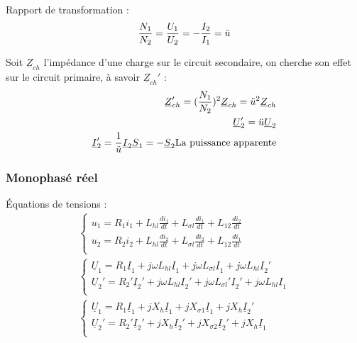 \documentclass[../main.tex]{subfiles}
\begin{document}
Rapport de transformation : \\
\begin{equation}
    \frac{N_1}{N_2} = \frac{U_1}{U_2} = -\frac{I_2}{I_1} = \Ddot{u}
\end{equation}

Soit $\underline{Z}_{ch}$ l'impédance d'une charge sur le circuit secondaire, on cherche son effet sur le circuit primaire, à savoir $\underline{Z}_{ch}'$ : \begin{equation}\begin{split}
    \underline{Z}_{ch}' = (\frac{N_1}{N_2})^2 \underline{Z}_{ch} = \Ddot{u}^2 \underline{Z}_{ch}\\
    \underline{U}_2' = \Ddot{u}\underline{U}_2\\
    \underline{I}_2' = \frac{1}{\Ddot{u}}\underline{I}_2
    \underline{S}_1 = -\underline{S}_2 \text{La puissance apparente}
    \end{split}
\end{equation}

\subsubsection{Monophasé réel}
Équations de tensions : \begin{equation}
    \begin{split}
        \begin{cases}
            u_1 = R_1 i_1 + L_{hl} \frac{di_1}{dt} + L_{\sigma l} \frac{di_1}{dt} + L_{12} \frac{di_2}{dt}\\
            u_2 = R_2 i_2 + L_{hl} \frac{di_2}{dt} + L_{\sigma l} \frac{di_2}{dt} + L_{12} \frac{di_1}{dt}\\
        \end{cases}\\
        \begin{cases}
            \underline{U}_1 = R_1 \underline{I}_1 + j \omega L_{hl} \underline{I}_1 + j \omega L_{\sigma l} \underline{I}_1 + j\omega L_{hl} \underline{I}_2'\\
            \underline{U}_2' = R_2' \underline{I}_2' + j \omega L_{hl} \underline{I}_2' + j \omega L_{\sigma l}' \underline{I}_2' + j\omega L_{hl} \underline{I}_1\\
        \end{cases}\\
        \begin{cases}
            \underline{U}_1 = R_1 \underline{I}_1 + j X_h \underline{I}_1 + j X_{\sigma 1} \underline{I}_1 + j X_{h} \underline{I}_2'\\
            \underline{U}_2' = R_2' \underline{I}_2' + j X_{h} \underline{I}_2' + j X_{\sigma 2} \underline{I}_2' + j X_{h} \underline{I}_1\\
        \end{cases}
    \end{split}
\end{equation}
\end{document}
